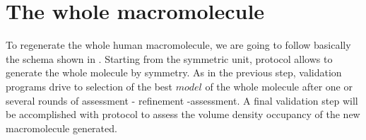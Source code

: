 \section{The whole macromolecule}
\label{wholemacromolecule}

To regenerate the whole human  macromolecule, we are going to follow basically the schema shown in . Starting from the symmetric unit, \chimera {} protocol allows to generate the whole molecule by symmetry. As in the previous step, validation programs drive to selection of the best $model$ of the whole molecule after one or several rounds of assessment - refinement -assessment. A final validation step will be accomplished with \chimera {} protocol to assess the volume density occupancy of the new macromolecule generated.


